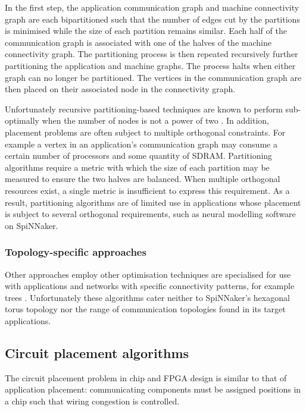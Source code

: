 				In the first step, the application communication graph and machine
				connectivity graph are each bipartitioned such that the number of edges
				cut by the partitions is minimised while the size of each partition
				remains similar. Each half of the communication graph is associated
				with one of the halves of the machine connectivity graph.  The
				partitioning process is then repeated recursively further partitioning
				the application and machine graphs. The process halts when either graph
				can no longer be partitioned.  The vertices in the communication graph
				are then placed on their associated node in the connectivity graph.
				
				Unfortunately recursive partitioning-based techniques are known to
				perform sub-optimally when the number of nodes is not a power of two
				\cite{simon97}. In addition, placement problems are often subject to
				multiple orthogonal constraints. For example a vertex in an
				application's communication graph may consume a certain number of
				processors and some quantity of SDRAM. Partitioning algorithms require
				a metric with which the size of each partition may be measured to
				ensure the two halves are balanced. When multiple orthogonal resources
				exist, a single metric is insufficient to express this requirement. As
				a result, partitioning algorithms are of limited use in applications
				whose placement is subject to several orthogonal requirements, such as
				neural modelling software on SpiNNaker.
				
			\subsubsection{Topology-specific approaches}
				
				Other approaches employ other optimisation techniques are specialised
				for use with applications and networks with specific connectivity
				patterns, for example trees \cite{jeannot14,traff02}. Unfortunately
				these algorithms cater neither to SpiNNaker's hexagonal torus topology
				nor the range of communication topologies found in its target
				applications.
	
		\subsection{Circuit placement algorithms}
			
			The circuit placement problem in chip and FPGA design is similar to that
			of application placement: communicating components must be assigned
			positions in a chip such that wiring congestion is controlled.
			
